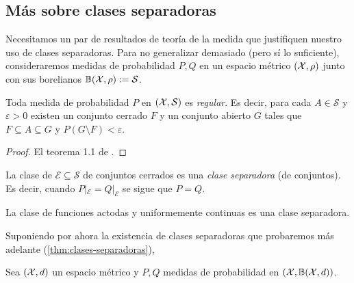 \documentclass[main.tex]{subfiles}
\begin{document}
\subsection{Más sobre clases separadoras}
Necesitamos un par de resultados de teoría de la medida que justifiquen nuestro uso de clases separadoras. Para no generalizar demasiado (pero sí lo suficiente), consideraremos medidas de probabilidad $P, Q$ en un espacio métrico $(\operatorname{\mathcal{X}}, \rho)$ junto con sus borelianos $\mathbb{B}(\operatorname{\mathcal{X}}, \rho) := \mathcal{S}$. 

\begin{lemma}
    Toda medida de probabilidad $P$ en $(\operatorname{\mathcal{X}}, \mathcal{S})$ es \textit{regular}. Es decir, para cada $A\in \mathcal{S}$ y $\varepsilon > 0$ existen un conjunto cerrado $F$ y un conjunto abierto $G$ tales que $F\subseteq A \subseteq G$ y $P(G\setminus F) < \varepsilon$.
\end{lemma}
\begin{proof}
    El teorema 1.1 de \cite{billingsley-convergence}.
\end{proof}

\begin{corollary}
    La clase de $\mathcal{E}\subseteq\mathcal{S}$ de conjuntos cerrados es una \textit{clase separadora} (de conjuntos). Es decir, cuando $P|_\mathcal{E} = Q|_\mathcal{E}$ se sigue que $P=Q$.
\end{corollary}

\begin{theorem}
    La clase de funciones actodas y uniformemente continuas es una clase separadora.
\end{theorem}

Suponiendo por ahora la existencia de clases separadoras que probaremos más adelante (\eqref{thm:clases-separadoras}),


\begin{theorem}\label{thm:clases-separadoras}
    Sea $(\operatorname{\mathcal{X}}, d)$ un espacio métrico y $P, Q$ medidas de probabilidad en $(\operatorname{\mathcal{X}}, \mathbb{B}(\operatorname{\mathcal{X}}, d))$.
\end{theorem}
\end{document}
